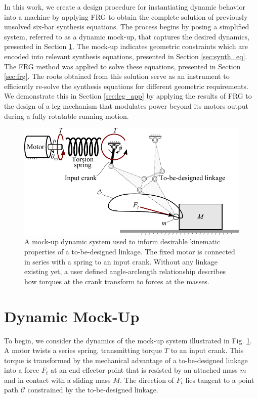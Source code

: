 \documentclass[journal]{IEEEtran}
\begin{document}
In this work, we create a design procedure for instantiating dynamic behavior into a machine by applying FRG to obtain the complete solution of previously unsolved six-bar synthesis equations.
The process begins by posing a simplified system, referred to as a dynamic mock-up, that captures the desired dynamics, presented in Section \ref{sec:dynamic_mock-up}.
The mock-up indicates geometric constraints which are encoded into relevant synthesis equations, presented in Section \ref{sec:synth_eq}.
The FRG method was applied to solve these equations, presented in Section \ref{sec:frg}.
The roots obtained from this solution serve as an instrument to efficiently re-solve the synthesis equations for different geometric requirements.
We demonstrate this in Section \ref{sec:leg_app} by applying the results of FRG to the design of a leg mechanism that modulates power beyond its motors output during a fully rotatable running motion.






\begin{figure}[!b]
\centering
\includegraphics[width=1\linewidth]{dynamic_model}
\caption{A mock-up dynamic system used to inform desirable kinematic properties of a to-be-designed linkage.  The fixed motor is connected in series with a spring to an input crank.  Without any linkage existing yet, a user defined angle-arclength relationship describes how torques at the crank transform to forces at the masses.}
\label{dynamic_model}
\end{figure}


\section{Dynamic Mock-Up}
\label{sec:dynamic_mock-up}

To begin, we consider the dynamics of the mock-up system illustrated in Fig. \ref{dynamic_model}.
A motor twists a series spring, transmitting torque $T$ to an input crank.
This torque is transformed by the mechanical advantage of a to-be-designed linkage into a force $F_t$ at an end effector point that is resisted by an attached mass $m$ and in contact with a sliding mass $M$.
The direction of $F_t$ lies tangent to a point path $\mathcal{C}$ constrained by the to-be-designed linkage.
\end{document}
